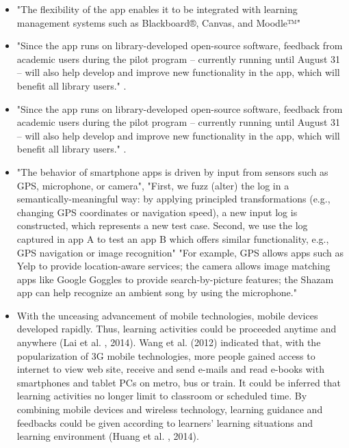 \begin{itemize}
    \paragraph{}
        \item
        "The flexibility of the app enables it to be integrated with learning management systems such as Blackboard®, Canvas, and Moodle™" \cite{campusM}
        \item
        "Since the app runs on library-developed open-source software, feedback from academic users during the pilot program – currently running until August 31 – will also help develop and improve new functionality in the app, which will benefit all library users." \cite{NYU_Library}.
        \item
        "Since the app runs on library-developed open-source software, feedback from academic users during the pilot program – currently running until August 31 – will also help develop and improve new functionality in the app, which will benefit all library users." \cite{NYU_Library}.
        \item 
        "The behavior of smartphone apps is driven by input from
        sensors such as GPS, microphone, or camera", 
        "First, we fuzz (alter) the log in a semantically-meaningful way: by applying 
        principled transformations (e.g., changing GPS coordinates
        or navigation speed), a new input log is constructed, which
        represents a new test case. Second, we use the log captured
        in app A to test an app B which offers similar functionality,
        e.g., GPS navigation or image recognition"
        "For example, GPS allows apps such as Yelp to provide location-aware services; the camera allows image matching apps like Google Goggles to provide search-by-picture features; the Shazam app can help recognize an ambient song by using the microphone."
        \cite{FuzzyAndCross}
        \item
        With the unceasing advancement of mobile technologies, mobile devices developed rapidly. Thus, learning activities could be proceeded anytime and anywhere (Lai et al. , 2014). Wang et al. (2012) indicated that, with the popularization of 3G mobile technologies, more people gained access to internet to view web site, receive and send e-mails and read e-books with smartphones and tablet PCs on metro, bus or train. It could be inferred that learning activities no longer limit to classroom or scheduled time. By combining mobile devices and wireless technology, learning guidance and feedbacks could be given according to learners' learning situations and learning environment (Huang et al. , 2014).


\end{itemize}
